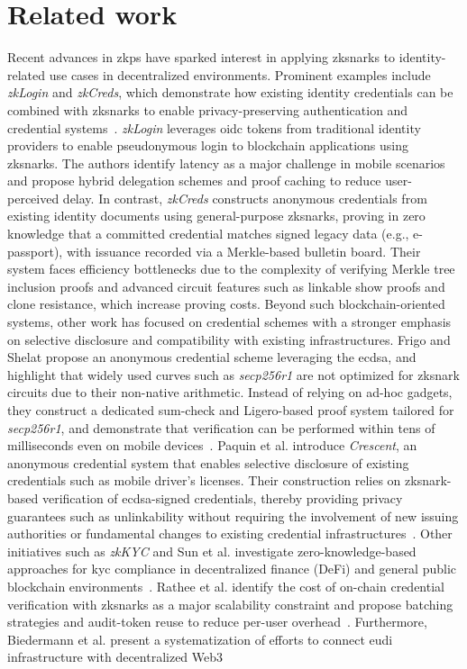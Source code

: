 \section{Related work}
\label{sec:related-work}
Recent advances in \acrshort{zkp}s have sparked interest in applying \acrshort{zksnark}s to identity-related use cases in decentralized environments. Prominent examples include \textit{zkLogin} and \textit{zkCreds}, which demonstrate how existing identity credentials can be combined with \acrshort{zksnark}s to enable privacy-preserving authentication and credential systems~\cite{Baldimtsi_2024,rosenberg2023}. \textit{zkLogin} leverages \acrfull{oidc} tokens from traditional identity providers to enable pseudonymous login to blockchain applications using \acrshort{zksnark}s. The authors identify latency as a major challenge in mobile scenarios and propose hybrid delegation schemes and proof caching to reduce user-perceived delay. In contrast, \textit{zkCreds} constructs anonymous credentials from existing identity documents using general-purpose \acrshort{zksnark}s, proving in zero knowledge that a committed credential matches signed legacy data (e.g., e-passport), with issuance recorded via a Merkle-based bulletin board. Their system faces efficiency bottlenecks due to the complexity of verifying Merkle tree inclusion proofs and advanced circuit features such as linkable show proofs and clone resistance, which increase proving costs. Beyond such blockchain-oriented systems, other work has focused on credential schemes with a stronger emphasis on selective disclosure and compatibility with existing infrastructures. Frigo and Shelat propose an anonymous credential scheme leveraging the \acrfull{ecdsa}, and highlight that widely used curves such as \textit{secp256r1} are not optimized for \acrshort{zksnark} circuits due to their non-native arithmetic. Instead of relying on ad-hoc gadgets, they construct a dedicated sum-check and Ligero-based proof system tailored for \textit{secp256r1}, and demonstrate that verification can be performed within tens of milliseconds even on mobile devices~\cite{cryptoeprint:2024/2010}. Paquin et al. introduce \textit{Crescent}, an anonymous credential system that enables selective disclosure of existing credentials such as mobile driver’s licenses. Their construction relies on \acrshort{zksnark}-based verification of \acrshort{ecdsa}-signed credentials, thereby providing privacy guarantees such as unlinkability without requiring the involvement of new issuing authorities or fundamental changes to existing credential infrastructures~\cite{cryptoeprint:2024/2013}. Other initiatives such as \textit{zkKYC} and Sun et al. investigate zero-knowledge-based approaches for \acrshort{kyc} compliance in decentralized finance (DeFi) and general public blockchain environments~\cite{cryptoeprint:2022/321,su142114584}. Rathee et al. identify the cost of on-chain credential verification with \acrshort{zksnark}s as a major scalability constraint and propose batching strategies and audit-token reuse to reduce per-user overhead~\cite{cryptoeprint:2022/1286}. Furthermore, Biedermann et al. present a systematization of efforts to connect \acrshort{eudi} infrastructure with decentralized Web3 